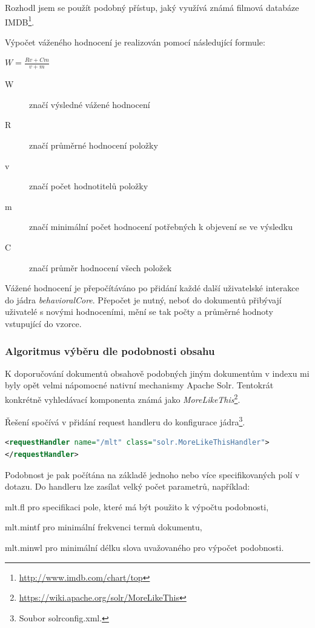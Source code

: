 \documentclass[thesis=M,czech]{FITthesis}[2014/05/07]
\begin{document}
Rozhodl jsem se použít podobný přístup, jaký využívá známá filmová databáze IMDB\footnote{\url{http://www.imdb.com/chart/top}}. 

Výpočet váženého hodnocení je realizován pomocí následující formule:

\begin{center}
$W = \frac{Rv + Cm}{v + m}$
\end{center}

\begin{description}
	\item[W] značí výsledné vážené hodnocení
	\item[R] značí průměrné hodnocení položky
	\item[v] značí počet hodnotitelů položky
	\item[m] značí minimální počet hodnocení potřebných k objevení se ve výsledku
	\item[C] značí průměr hodnocení všech položek
\end{description}

Vážené hodnocení je přepočítáváno po přidání každé další uživatelské interakce do jádra \emph{behavioralCore}. Přepočet je nutný, neboť do dokumentů přibývají uživatelé s novými hodnoceními, mění se tak počty a průměrné hodnoty vstupující do vzorce.

\subsubsection{Algoritmus výběru dle podobnosti obsahu}
K doporučování dokumentů obsahově podobných jiným dokumentům v indexu mi byly opět velmi nápomocné nativní mechanismy Apache Solr. Tentokrát konkrétně vyhledávací komponenta známá jako \emph{MoreLikeThis}\footnote{\url{https://wiki.apache.org/solr/MoreLikeThis}}.

Řešení spočívá v přidání request handleru do konfigurace jádra\footnote{Soubor solrconfig.xml.}.

\begin{lstlisting}[language=xml]
<requestHandler name="/mlt" class="solr.MoreLikeThisHandler">
</requestHandler>
\end{lstlisting}

Podobnost je pak počítána na základě jednoho nebo více specifikovaných polí v dotazu. Do handleru lze zasílat velký počet parametrů, například:

\begin{description}
	\item mlt.fl pro specifikaci pole, které má být použito k výpočtu podobnosti,
	\item mlt.mintf pro minimální frekvenci termů dokumentu,
	\item mlt.minwl pro minimální délku slova uvažovaného pro výpočet podobnosti.
\end{description}
\end{document}
